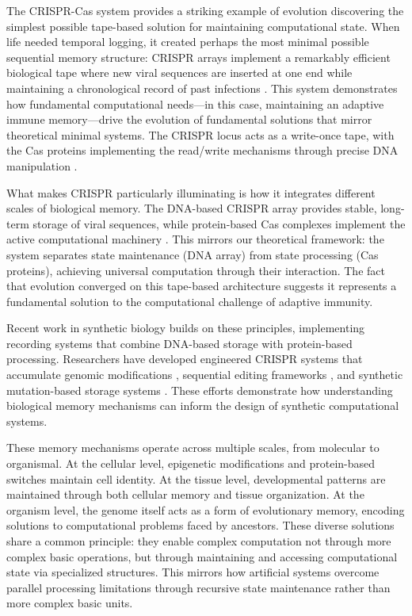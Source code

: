 \documentclass[12pt]{article}
\begin{document}
The CRISPR-Cas system provides a striking example of evolution discovering the simplest possible tape-based solution for maintaining computational state.
When life needed temporal logging, it created perhaps the most minimal possible sequential memory structure: CRISPR arrays implement a remarkably efficient biological tape where new viral sequences are inserted at one end while maintaining a chronological record of past infections \cite{sheth2017multiplex}.
This system demonstrates how fundamental computational needs---in this case, maintaining an adaptive immune memory---drive the evolution of fundamental solutions that mirror theoretical minimal systems.
The CRISPR locus acts as a write-once tape, with the Cas proteins implementing the read/write mechanisms through precise DNA manipulation \cite{choi2022time}.

What makes CRISPR particularly illuminating is how it integrates different scales of biological memory.
The DNA-based CRISPR array provides stable, long-term storage of viral sequences, while protein-based Cas complexes implement the active computational machinery \cite{sadremomtaz2023digital}.
This mirrors our theoretical framework: the system separates state maintenance (DNA array) from state processing (Cas proteins), achieving universal computation through their interaction.
The fact that evolution converged on this tape-based architecture suggests it represents a fundamental solution to the computational challenge of adaptive immunity.

Recent work in synthetic biology builds on these principles, implementing recording systems that combine DNA-based storage with protein-based processing.
Researchers have developed engineered CRISPR systems that accumulate genomic modifications \cite{sheth2017multiplex}, sequential editing frameworks \cite{choi2022time}, and synthetic mutation-based storage systems \cite{sadremomtaz2023digital}.
These efforts demonstrate how understanding biological memory mechanisms can inform the design of synthetic computational systems.

These memory mechanisms operate across multiple scales, from molecular to organismal.
At the cellular level, epigenetic modifications and protein-based switches maintain cell identity.
At the tissue level, developmental patterns are maintained through both cellular memory and tissue organization.
At the organism level, the genome itself acts as a form of evolutionary memory, encoding solutions to computational problems faced by ancestors.
These diverse solutions share a common principle: they enable complex computation not through more complex basic operations, but through maintaining and accessing computational state via specialized structures.
This mirrors how artificial systems overcome parallel processing limitations through recursive state maintenance rather than more complex basic units.
\end{document}
